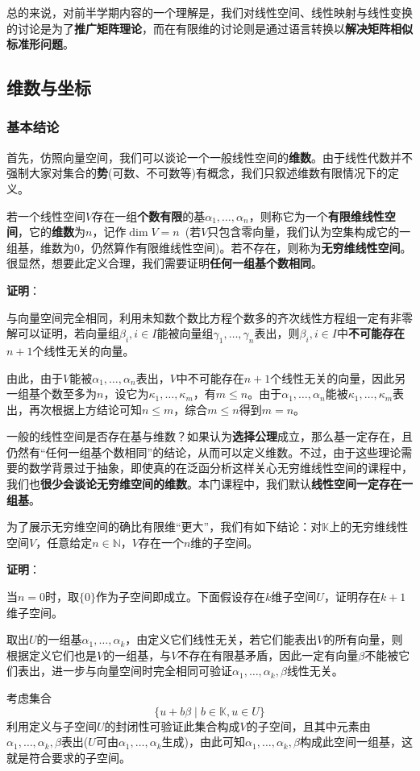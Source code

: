 \documentclass[a4paper,UTF8,fontset=windows,AutoFakeBold]{ctexart}
\newcommand*{\note}{\noindent *}
\newcommand{\proo}[1]{{\vspace{5pt}\kaishu\noindent\textbf{证明}：\vspace{-3pt}
\begin{compactitem}
    \item[] #1
\end{compactitem}
}}
\begin{document}
总的来说，对前半学期内容的一个理解是，我们对线性空间、线性映射与线性变换的讨论是为了\textbf{推广矩阵理论}，而在有限维的讨论则是通过语言转换以\textbf{解决矩阵相似标准形问题}。

\subsection{维数与坐标}
\subsubsection{基本结论}
首先，仿照向量空间，我们可以谈论一个一般线性空间的\textbf{维数}。由于线性代数并不强制大家对集合的\textbf{势}(可数、不可数等)有概念，我们只叙述维数有限情况下的定义。

若一个线性空间$V$存在一组\textbf{个数有限}的基$\alpha_1,\dots,\alpha_n$，则称它为一个\textbf{有限维线性空间}，它的\textbf{维数}为$n$，记作$\dim V=n$\ (若$V$只包含零向量，我们认为空集构成它的一组基，维数为0，仍然算作有限维线性空间)。若不存在，则称为\textbf{无穷维线性空间}。很显然，想要此定义合理，我们需要证明\textbf{任何一组基个数相同}。

\proo{
    与向量空间完全相同，利用未知数个数比方程个数多的齐次线性方程组一定有非零解可以证明，若向量组$\beta_i,i\in I$能被向量组$\gamma_1,\dots,\gamma_n$表出，则$\beta_i,i\in I$中\textbf{不可能存在}$n+1$个线性无关的向量。

    由此，由于$V$能被$\alpha_1,\dots,\alpha_n$表出，$V$中不可能存在$n+1$个线性无关的向量，因此另一组基个数至多为$n$，设它为$\kappa_1,\dots,\kappa_m$，有$m\le n$。由于$\alpha_1,\dots,\alpha_n$能被$\kappa_1,\dots,\kappa_m$表出，再次根据上方结论可知$n\le m$，综合$m\le n$得到$m=n$。
}

\note 一般的线性空间是否存在基与维数？如果认为\textbf{选择公理}成立，那么基一定存在，且仍然有``任何一组基个数相同''的结论，从而可以定义维数。不过，由于这些理论需要的数学背景过于抽象，即使真的在泛函分析这样关心无穷维线性空间的课程中，我们也\textbf{很少会谈论无穷维空间的维数}。本门课程中，我们默认\textbf{线性空间一定存在一组基}。

为了展示无穷维空间的确比有限维``更大''，我们有如下结论：对$\mathbb{K}$上的无穷维线性空间$V$，任意给定$n\in\mathbb{N}$，$V$存在一个$n$维的子空间。

\proo{
    当$n=0$时，取$\{0\}$作为子空间即成立。下面假设存在$k$维子空间$U$，证明存在$k+1$维子空间。

    取出$U$的一组基$\alpha_1,\dots,\alpha_k$，由定义它们线性无关，若它们能表出$V$的所有向量，则根据定义它们也是$V$的一组基，与$V$不存在有限基矛盾，因此一定有向量$\beta$不能被它们表出，进一步与向量空间时完全相同可验证$\alpha_1,\dots,\alpha_k,\beta$线性无关。

    考虑集合
    $$\{u+b\beta\mid b\in\mathbb{K},u\in U\}$$
    利用定义与子空间$U$的封闭性可验证此集合构成$V$的子空间，且其中元素由$\alpha_1,\dots,\alpha_k,\beta$表出($U$可由$\alpha_1,\dots,\alpha_k$生成)，由此可知$\alpha_1,\dots,\alpha_k,\beta$构成此空间一组基，这就是符合要求的子空间。
}
\end{document}
